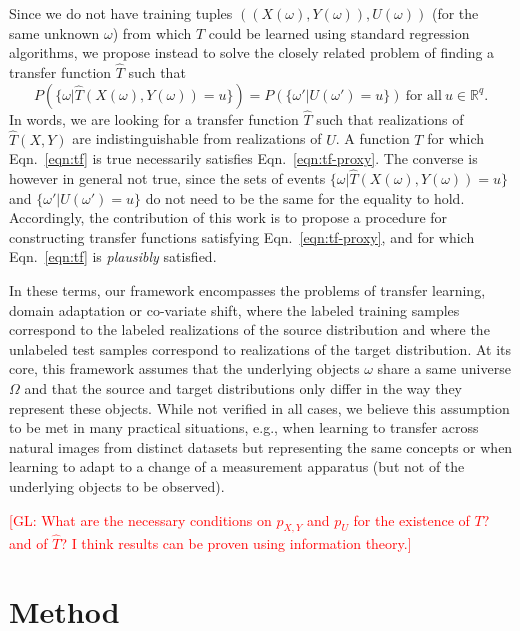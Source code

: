 \documentclass{article}
\newcommand{\glnote}[1]{\textcolor{red}{[GL: #1]}}
\theoremstyle{plain}
\begin{document}
Since we do not have training tuples $((X(\omega), Y(\omega)), U(\omega))$ (for the same
unknown $\omega$) from which $T$ could be learned using standard regression
algorithms, we propose instead to solve the closely related problem of
finding a transfer function $\hat T$ such that
\begin{equation}\label{eqn:tf-proxy}
P(\{ \omega | \hat T(X(\omega), Y(\omega)) = u \}) = P(\{ \omega' | U(\omega') = u \}) ~\text{for all}~ u \in \mathbb{R}^q.
\end{equation}
In words, we are looking for a transfer function $\hat T$ such that realizations
of $\hat T(X,Y)$ are indistinguishable from realizations of $U$. A function $T$ for
which Eqn.~\ref{eqn:tf} is true necessarily satisfies Eqn.~\ref{eqn:tf-proxy}.
The converse is however in general not true, since the sets of events $\{ \omega |
\hat T(X(\omega), Y(\omega)) = u \}$ and $\{ \omega' | U(\omega') = u \}$ do not need to be
the same for the equality to hold. Accordingly, the contribution of this work is
to propose a procedure for constructing transfer functions satisfying
Eqn.~\ref{eqn:tf-proxy}, and for which Eqn.~\ref{eqn:tf} is {\it plausibly}
satisfied.

In these terms, our framework encompasses the problems of transfer learning,
domain adaptation or co-variate shift, where the labeled training samples
correspond to the labeled realizations of the source distribution and where the
unlabeled test samples correspond to realizations of the target distribution. At
its core, this framework assumes that the underlying objects $\omega$ share a
same universe $\Omega$ and that the source and target distributions only differ
in the way they represent these objects. While not verified in all cases, we
believe this assumption to be met in many practical situations, e.g., when
learning to transfer across natural images from distinct datasets but
representing the same concepts or when learning to adapt to a change of a
measurement apparatus (but not of the underlying objects to be observed).

\glnote{What are the necessary conditions on $p_{X,Y}$ and $p_U$ for
        the existence of $T$? and of $\hat T$? I think results can be proven using information theory.}



\section{Method}
\end{document}
